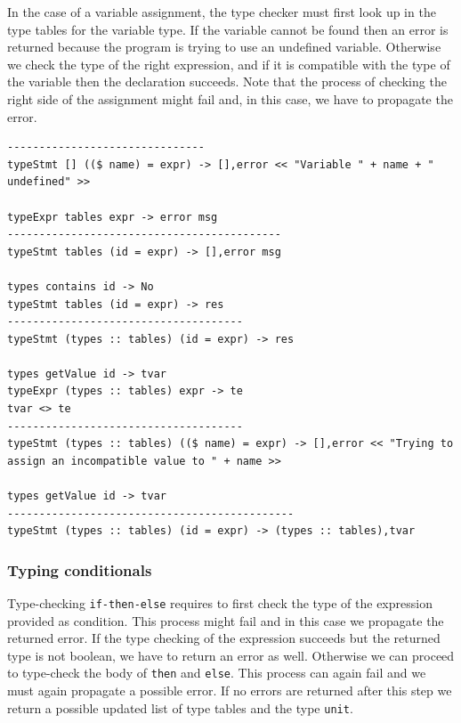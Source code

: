 In the case of a variable assignment, the type checker must first look up in the type tables for the variable type. If the variable cannot be found then an error is returned because the program is trying to use an undefined variable. Otherwise we check the type of the right expression, and if it is compatible with the type of the variable then the declaration succeeds. Note that the process of checking the right side of the assignment might fail and, in this case, we have to propagate the error.

\begin{lstlisting}
-------------------------------
typeStmt [] (($ name) = expr) -> [],error << "Variable " + name + " undefined" >>

typeExpr tables expr -> error msg
-------------------------------------------
typeStmt tables (id = expr) -> [],error msg

types contains id -> No
typeStmt tables (id = expr) -> res
-------------------------------------
typeStmt (types :: tables) (id = expr) -> res

types getValue id -> tvar
typeExpr (types :: tables) expr -> te
tvar <> te
-------------------------------------
typeStmt (types :: tables) (($ name) = expr) -> [],error << "Trying to assign an incompatible value to " + name >>

types getValue id -> tvar
---------------------------------------------
typeStmt (types :: tables) (id = expr) -> (types :: tables),tvar
\end{lstlisting}

\subsubsection{Typing conditionals}
Type-checking \texttt{if-then-else} requires to first check the type of the expression provided as condition. This process might fail and in this case we propagate the returned error. If the type checking of the expression succeeds but the returned type is not boolean, we have to return an error as well. Otherwise we can proceed to type-check the body of \texttt{then} and \texttt{else}. This process can again fail and we must again propagate a possible error. If no errors are returned after this step we return a possible updated list of type tables and the type \texttt{unit}.

